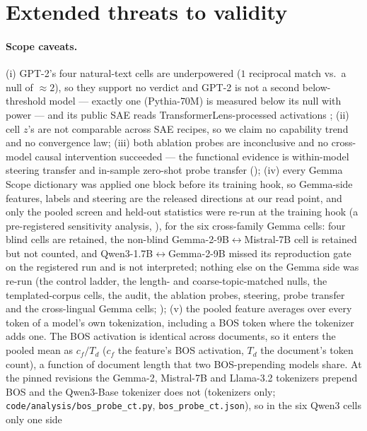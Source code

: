 

\section{Extended threats to validity}\label{app:threats}

\paragraph{Scope caveats.} (i) GPT-2's four
natural-text cells are underpowered ($1$ reciprocal match vs.\ a null of ${\approx}2$),
so they support no verdict and GPT-2 is not a second below-threshold model --- exactly
one (Pythia-70M) is measured below its null with power --- and its
public SAE reads TransformerLens-processed activations \citep{nanda2022transformerlens};
(ii) cell $z$'s are not comparable across SAE recipes, so we claim no capability trend
and no convergence law; (iii) both ablation probes are inconclusive and no
cross-model causal intervention succeeded --- the functional evidence is within-model
steering transfer and in-sample zero-shot probe
transfer (); (iv) every Gemma Scope dictionary was applied one
block before its training hook, so Gemma-side features, labels and steering are the released
directions at our read point, and only the pooled screen and held-out statistics were re-run at the
training hook (a pre-registered sensitivity analysis, ), for the six
cross-family Gemma cells: four blind cells are retained, the non-blind
Gemma-2-9B$\leftrightarrow$Mistral-7B cell is retained but not counted, and
Qwen3-1.7B$\leftrightarrow$Gemma-2-9B missed its reproduction gate on the registered run and is not
interpreted; nothing else on the Gemma side was re-run (the control ladder, the length- and
coarse-topic-matched nulls, the templated-corpus cells, the \citeauthor{lan2024universal} audit, the
ablation probes, steering, probe transfer and the cross-lingual Gemma cells; );
(v) the pooled feature averages over every token of a model's own tokenization, including a BOS
token where the tokenizer adds one. The BOS activation is identical across documents, so it enters
the pooled mean as $c_f/T_d$ ($c_f$ the feature's BOS activation, $T_d$ the document's token count),
a function of document length that two BOS-prepending models share. At the pinned revisions the
Gemma-2, Mistral-7B and Llama-3.2 tokenizers prepend BOS and the Qwen3-Base tokenizer does not
(tokenizers only; \texttt{code/analysis/bos\_probe\_ct.py}, \texttt{bos\_probe\_ct.json}), so in the six Qwen3 cells only one side
